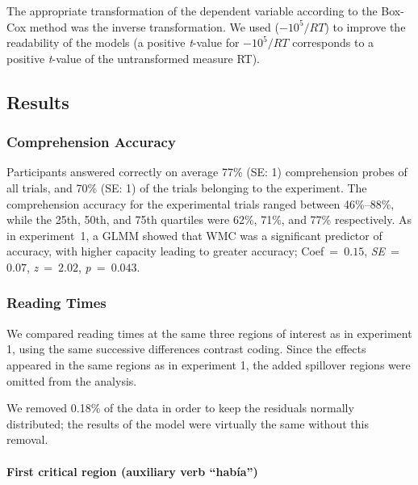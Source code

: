 \documentclass{frontiersSCNS}\usepackage{knitr}
\begin{document}
The appropriate transformation of the dependent variable according to the Box-Cox method \citep{BoxCox1964} was the inverse transformation. We used ($-\ensuremath{10^{5}}/RT$) to improve the readability of the models  (a positive \textit{t}-value for $-\ensuremath{10^{5}}/RT$ corresponds to a positive \textit{t}-value of the untransformed measure RT). 


\subsection{Results}

\subsubsection{Comprehension Accuracy}


Participants answered correctly on average 77\% (SE: 1) comprehension probes of all trials, and 70\% (SE: 1) of the trials belonging to the experiment.  The comprehension accuracy for the experimental trials ranged between 46\%--88\%, while the 25th, 50th, and 75th quartiles were 62\%, 71\%, and 77\% respectively. As in experiment~1, a GLMM showed that WMC was a significant predictor of accuracy, with higher capacity leading to greater accuracy; \mbox{Coef = $0.15$}, \mbox{\textit{SE} = $0.07$}, \mbox{\textit{z} = $2.02$}, \mbox{\textit{p} = $0.043$}.

  









\subsubsection{Reading Times}

We compared reading times at the same three regions of interest as in experiment 1, using the same successive differences contrast coding. Since the effects appeared in the same regions as in experiment 1, the added spillover regions were omitted from the analysis.

We removed 0.18\% of the data in order to keep the residuals normally distributed; the results of the model were virtually the same without this removal.

\paragraph{First critical region (auxiliary verb ``había'')}
\end{document}
